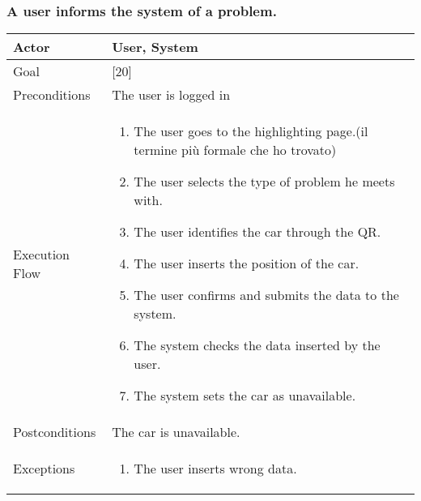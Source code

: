 \documentclass{article}
\begin{document}
  \subsubsection{A user informs the system of a problem.}
  \begin{tabularx}{\textwidth}{  l  X  }
    \hline
    Actor & User, System\\
    \hline
    Goal & [20]\\
    \hline
    Preconditions & The user is logged in\\
    \hline
    Execution Flow & \begin{enumerate}
      \item{The user goes to the highlighting page.(il termine più formale che ho trovato)}
                     \item{The user selects the type of problem he meets with.}
                     \item{The user identifies the car through the QR.}
                     \item{The user inserts the position of the car.}
                     \item{The user confirms and submits the data to the system.}
                     \item{The system checks the data inserted by the user.}
                     \item{The system sets the car as unavailable.}
                    \end{enumerate}\\
    \hline
    Postconditions & The car is unavailable.\\
    \hline
    Exceptions & \begin{enumerate}
        \item{The user inserts wrong data.}
  \end{enumerate}\\
    \hline
  \end{tabularx}
\end{document}
